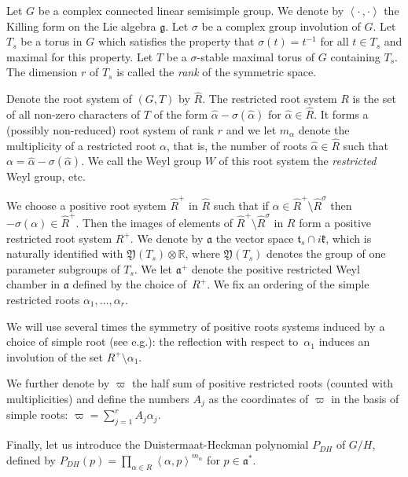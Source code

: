 \documentclass[10pt]{amsart}
\theoremstyle{plain}
\theoremstyle{definition}
\newcommand{\fa}{\mathfrak{a}}
\newcommand{\ha}{\hat{\alpha}}
\newcommand{\Roots}{\hat{R}}
\newcommand{\rRoots}{R}
\providecommand{\eg}{e.g.}\providecommand{\ie}{i.e.}\providecommand{\etc}{etc.}\providecommand{\resp}{resp.}\providecommand{\cf}{cf.}
\begin{document}
Let $G$ be a complex connected linear semisimple group.
We denote by $\left<\cdot\,,\cdot\right>$ the Killing form on the Lie algebra
$\mathfrak{g}$.
Let $\sigma$ be a complex group involution of $G$.
Let $T_s$ be a torus in $G$ which satisfies the property that
$\sigma(t)=t^{-1}$ for all $t\in T_s$ and maximal for this property.
Let $T$ be a $\sigma$-stable maximal torus of $G$ containing $T_s$.
The dimension $r$ of $T_s$ is called the \emph{rank} of the symmetric space.

Denote the root system of $(G,T)$ by $\Roots$.
The restricted root system $\rRoots$ is the set of all non-zero characters
of $T$ of the form $\ha-\sigma(\ha)$ for $\ha\in \Roots$.
It forms a (possibly non-reduced) root system of rank $r$ and we let $m_{\alpha}$
denote the multiplicity of a restricted root $\alpha$, that is, the number of
roots $\ha\in \Roots$ such that $\alpha=\ha-\sigma(\ha)$.
We call the Weyl group $W$ of this root system the \emph{restricted} Weyl group, etc.

We choose a positive root system $\Roots^+$ in $\Roots$ such that if
$\alpha\in \Roots^+\setminus \Roots^{\sigma}$
then \hbox{$-\sigma(\alpha)\in \Roots^+$}. Then the images of elements of
$\Roots^+\setminus \Roots^{\sigma}$ in $\rRoots$ form a positive
restricted root system $\rRoots^+$.
We denote by $\fa$ the vector space
$\mathfrak{t}_s\cap i\mathfrak{k}$, which is naturally identified with
$\mathfrak{Y}(T_s)\otimes \mathbb{R}$, where $\mathfrak{Y}(T_s)$ denotes
the group of one parameter subgroups of $T_s$.
We let $\mathfrak{a}^+$ denote the positive restricted Weyl chamber in
$\mathfrak{a}$ defined by the choice of~$\rRoots^+$.
We fix an ordering of the simple restricted roots $\alpha_1,\ldots,\alpha_r$.

We will use several times the symmetry of positive roots systems induced by
a choice of simple root (see \eg \cite[Lem.\,10.2.B]{Hum78}):
the reflection with respect to~$\alpha_1$ induces
an involution of the set $\rRoots^+\setminus \alpha_1$.

We further denote by $\varpi$ the half sum of positive restricted roots
(counted with multiplicities) and define the numbers $A_j$ as
the coordinates of $\varpi$ in the basis of simple roots:
$\varpi = \sum_{j=1}^r A_j\alpha_j$.

Finally, let us introduce the Duistermaat-Heckman polynomial $P_{DH}$ of $G/H$,
defined by
$P_{DH}(p)=\prod_{\alpha\in\rRoots} \left<\alpha,p\right>^{m_{\alpha}}$
for $p\in \mathfrak{a}^*$.
\end{document}
